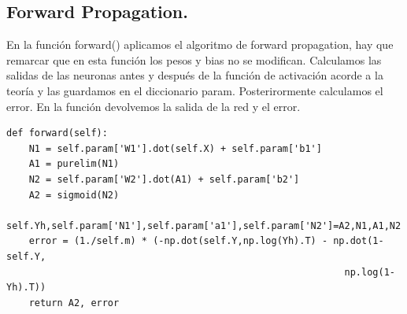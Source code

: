 \documentclass[a4paper,10pt]{article}
\begin{document}
\subsection{Forward Propagation.}
\noindent
En la función forward() aplicamos el algoritmo de forward propagation, hay que remarcar que en esta función los pesos y bias no se modifican. Calculamos las salidas de las neuronas antes y después de la función de activación acorde a la teoría y las guardamos en el diccionario param. Posterirormente calculamos el error. En la función devolvemos la salida de la red y el error.
\begin{lstlisting}
def forward(self):
    N1 = self.param['W1'].dot(self.X) + self.param['b1']
    A1 = purelim(N1)
    N2 = self.param['W2'].dot(A1) + self.param['b2']
    A2 = sigmoid(N2)
    self.Yh,self.param['N1'],self.param['a1'],self.param['N2']=A2,N1,A1,N2
    error = (1./self.m) * (-np.dot(self.Y,np.log(Yh).T) - np.dot(1-self.Y, 
                                                            np.log(1-Yh).T))
    return A2, error
\end{lstlisting}
\end{document}
